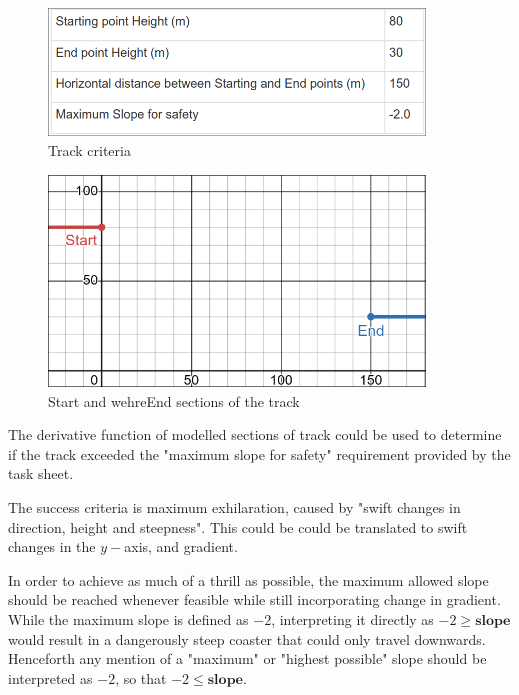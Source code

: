 \documentclass[11pt, letterpaper]{article}
\begin{document}
\begin{figure}[h]
	\centering
	\includegraphics[width=10cm, trim=4 4 2 2,clip]{trackdefined.png}
	\caption{Track criteria}
\end{figure}
		\begin{figure}[h]
	
	\begin{center}
		\includegraphics[width=10cm]{Start and End.png}
		
		\caption{Start and 
			wehreEnd sections of the track}
	\end{center}
	
	
\end{figure}

The derivative function of modelled sections of track could be used to determine if the track exceeded the "maximum slope for safety" requirement provided by the task sheet.

The success criteria is maximum exhilaration, caused by "swift changes in direction, height and steepness". This could be could be translated to swift changes in the $y-$axis, and gradient.

In order to achieve as much of a thrill as possible, the maximum allowed slope should be reached whenever feasible while still incorporating change in gradient.
While the maximum slope is defined as $-2$, interpreting it directly as $-2\geq \textbf{slope}$ would result in a dangerously steep coaster that could only travel downwards. Henceforth any mention of a "maximum" or "highest possible" slope should be interpreted as $-2$, so that $-2\leq \textbf{slope}$.
\end{document}
